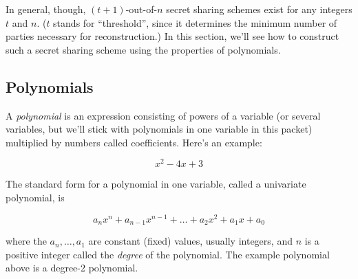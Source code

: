 \documentclass[12 pt]{article}
\newcounter{example}[section]
\begin{document}
In general, though, $(t+1)$-out-of-$n$ secret sharing schemes exist for any integers
$t$ and $n$.
($t$ stands for ``threshold'', since it determines the minimum number of parties necessary 
for reconstruction.)
In this section, we'll see how to construct such a secret sharing scheme using the properties 
of polynomials.

\subsection{Polynomials}

A \emph{polynomial} is an expression consisting of powers of a variable (or several variables,
but we'll stick with polynomials in one variable in this packet) multiplied by numbers called 
coefficients. Here's an example:

\[
    x^2 - 4x + 3
\]

The standard form for a polynomial in one variable, called a univariate polynomial, is 

\begin{equation}\label{eqn:std-form}
    a_n x^n + a_{n-1} x^{n-1} + \ldots + a_2 x^2 + a_1 x + a_0
\end{equation}

where the $a_n, \ldots, a_1$ are constant (fixed) values, usually integers, and $n$ 
is a positive integer called the \emph{degree} of the polynomial. The example polynomial
above is a degree-2 polynomial.

\begin{center}
\end{center}
\end{document}
